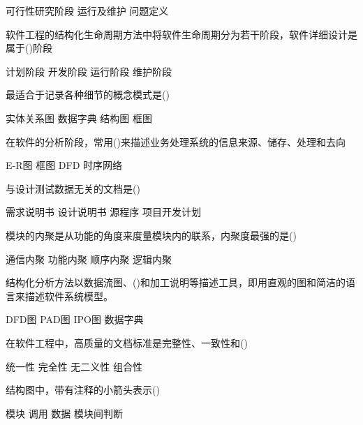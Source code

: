 \documentclass{exam}
\begin{document}
\begin{questions}
\begin{oneparchoices}
		\choice 可行性研究阶段
		\correctchoice 运行及维护
		\choice 问题定义
	\end{oneparchoices}
	\question 软件工程的结构化生命周期方法中将软件生命周期分为若干阶段，软件详细设计是属于()阶段\\
	\begin{oneparchoices}
		\choice 计划阶段
		\correctchoice 开发阶段
		\choice 运行阶段
		\choice 维护阶段
	\end{oneparchoices}
	\question 最适合于记录各种细节的概念模式是()\\
	\begin{oneparchoices}
		\choice 实体关系图
		\correctchoice 数据字典
		\choice 结构图
		\choice 框图
	\end{oneparchoices}
	\question 在软件的分析阶段，常用()来描述业务处理系统的信息来源、储存、处理和去向\\
	\begin{oneparchoices}
		\choice E-R图
		\choice 框图
		\correctchoice DFD
		\choice 时序网络
	\end{oneparchoices}
	\question 与设计测试数据无关的文档是()\\
	\begin{oneparchoices}
		\choice 需求说明书
		\choice 设计说明书
		\choice 源程序
		\correctchoice 项目开发计划
	\end{oneparchoices}
	\question 模块的内聚是从功能的角度来度量模块内的联系，内聚度最强的是()\\
	\begin{oneparchoices}
		\choice 通信内聚
		\correctchoice 功能内聚
		\choice 顺序内聚
		\choice 逻辑内聚
	\end{oneparchoices}
	\question 结构化分析方法以数据流图、()和加工说明等描述工具，即用直观的图和简洁的语言来描述软件系统模型。\\
	\begin{oneparchoices}
		\choice DFD图
		\choice PAD图
		\choice IPO图
		\correctchoice 数据字典
	\end{oneparchoices}
	\question 在软件工程中，高质量的文档标准是完整性、一致性和()\\
	\begin{oneparchoices}
		\choice 统一性
		\choice 完全性
		\correctchoice 无二义性
		\choice 组合性
	\end{oneparchoices}
	\question 结构图中，带有注释的小箭头表示()\\
	\begin{oneparchoices}
		\choice 模块
		\correctchoice 调用
		\choice 数据
		\choice 模块间判断
	\end{oneparchoices}

\end{questions}
\end{document}
